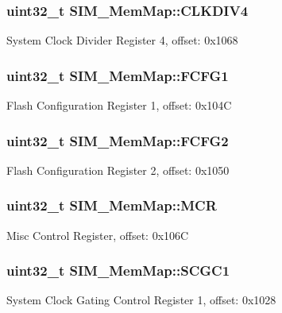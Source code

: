 \subsubsection[{C\+L\+K\+D\+I\+V4}]{\setlength{\rightskip}{0pt plus 5cm}uint32\+\_\+t S\+I\+M\+\_\+\+Mem\+Map\+::\+C\+L\+K\+D\+I\+V4}\label{struct_s_i_m___mem_map_af62cba904c04181d78d6ae12d49289a6}
System Clock Divider Register 4, offset\+: 0x1068 \hypertarget{struct_s_i_m___mem_map_a2b78edd16e6d046eb3399182216bf816}{}
\subsubsection[{F\+C\+F\+G1}]{\setlength{\rightskip}{0pt plus 5cm}uint32\+\_\+t S\+I\+M\+\_\+\+Mem\+Map\+::\+F\+C\+F\+G1}\label{struct_s_i_m___mem_map_a2b78edd16e6d046eb3399182216bf816}
Flash Configuration Register 1, offset\+: 0x104\+C \hypertarget{struct_s_i_m___mem_map_afd105923b2815e01119a5bc195ceebd6}{}
\subsubsection[{F\+C\+F\+G2}]{\setlength{\rightskip}{0pt plus 5cm}uint32\+\_\+t S\+I\+M\+\_\+\+Mem\+Map\+::\+F\+C\+F\+G2}\label{struct_s_i_m___mem_map_afd105923b2815e01119a5bc195ceebd6}
Flash Configuration Register 2, offset\+: 0x1050 \hypertarget{struct_s_i_m___mem_map_ae4061f7766a366a84137bea8ad8ca0ae}{}
\subsubsection[{M\+C\+R}]{\setlength{\rightskip}{0pt plus 5cm}uint32\+\_\+t S\+I\+M\+\_\+\+Mem\+Map\+::\+M\+C\+R}\label{struct_s_i_m___mem_map_ae4061f7766a366a84137bea8ad8ca0ae}
Misc Control Register, offset\+: 0x106\+C \hypertarget{struct_s_i_m___mem_map_a60b8b2dca489117a38ffb151a9811a16}{}
\subsubsection[{S\+C\+G\+C1}]{\setlength{\rightskip}{0pt plus 5cm}uint32\+\_\+t S\+I\+M\+\_\+\+Mem\+Map\+::\+S\+C\+G\+C1}\label{struct_s_i_m___mem_map_a60b8b2dca489117a38ffb151a9811a16}
System Clock Gating Control Register 1, offset\+: 0x1028 \hypertarget{struct_s_i_m___mem_map_a24daa19260e48fdf48c35cf7ed920d3a}{}

